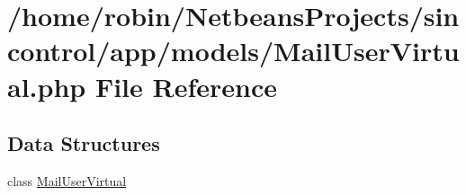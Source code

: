 \hypertarget{_mail_user_virtual_8php}{}\section{/home/robin/\+Netbeans\+Projects/sincontrol/app/models/\+Mail\+User\+Virtual.php File Reference}
\label{_mail_user_virtual_8php}
\subsection*{Data Structures}
\begin{DoxyCompactItemize}
\item 
class \hyperlink{class_mail_user_virtual}{Mail\+User\+Virtual}
\end{DoxyCompactItemize}
